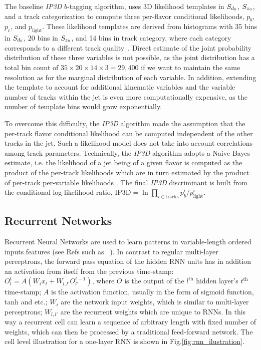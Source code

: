 The baseline \textit{IP3D} $b$-tagging algorithm, uses 3D likelihood templates in $S_{d{_0}}$, $S_{z{_0}}$, and a track categorization to compute three per-flavor conditional likelihoods, $p_b$, $p_c$, and $p_{\textrm{light}}$. These likelihood templates are derived from histograms with 35 bins in $S_{d{_0}}$, 20 bins in $S_{z{_0}}$, and 14 bins in track category, where each category corresponds to a different track quality~\cite{ATL-PHYS-PUB-2015-022}. Direct estimate of the joint probability distribution of these three variables is not possible, as the joint distribution has a total bin count of $35 \times 20 \times 14 \times 3 = 29,400$ if we want to maintain the same resolution as for the marginal distribution of each variable. In addition, extending the template to account for additional kinematic variables and the variable number of tracks within the jet is even more computationally expensive, as the number of template bins would grow exponentially.

To overcome this difficulty, the \textit{IP3D} algorithm made the assumption that the per-track flavor conditional likelihood can be computed independent of the other tracks in the jet.  Such a likelihood model does not take into account correlations among track parameters. Technically, the \textit{IP3D} algorithm adopts a Naive Bayes estimate, i.e. the likelihood of a jet being of a given flavor is computed as the product of the per-track likelihoods which are in turn estimated by the product of per-track per-variable likelihoods . The final \textit{IP3D} discriminant is built from the conditional log-likelihood ratio, $\textrm{IP3D}=\ln \prod_{i \in \textrm{tracks}} p_b^i / p_{\textrm{light}}^i$. 

\subsection{Recurrent Networks}

Recurrent Neural Networks are used to learn patterns in variable-length ordered inputs features (see Refs such as ~\cite{ref:RNNthesis, dlbook}). In contrast to regular multi-layer perceptrons, the forward pass equation of the hidden RNN units has in addition an activation from itself from the previous time-stamp: $O^t_l = A( W_i x_t + W_{l,l'} O^{t-1}_{l'})$, where $O$ is the output of the $l^{\text{th}}$ hidden layer's $t^{\text{th}}$ time-stamp; $A$ is the activation function, usually in the form of sigmoid function, tanh and etc.; $W_i$ are the network input weights, which is similar to multi-layer perceptrons; $W_{l,l'}$ are the recurrent weights which are unique to RNNs. In this way a recurrent cell can learn a sequence of arbitrary length with fixed number of weights, which can then be processed by a traditional feed-forward network. The cell level illustration for a one-layer RNN is shown in Fig.\ref{fig:rnn_ilustration}.

